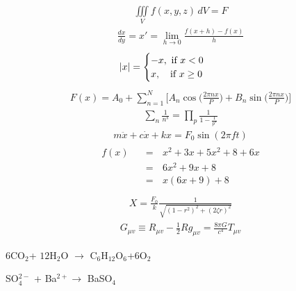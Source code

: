 \documentclass{article}
\newcommand\tab[1][1cm]{\hspace*{#1}}
\begin{document}
\begin{align*}
    \iiint\limits_{V} f(x,y,z) \,dV=F
\end{align*}
\begin{align*}
    \frac{dx}{dy}=x'=\lim_{h\to0} \frac{f(x+h)-f(x)}{h}
\end{align*}
\begin{align*}
    |x|=
    \begin{cases}
    -x,\text{ if } x<0 \tab\\
     x,\: \: \: \text{  if } x\ge0 \tab\\
    \end{cases}
\end{align*}
\begin{align*}
    F(x)=A_0+\sum_{n=1}^{N}\bigg[ A_n \cos\bigg({\frac{2\pi nx}{P}}\bigg)+B_n  \sin\bigg({\frac{2\pi nx}{P}}\bigg)\bigg]
\end{align*}
\begin{align*}
    \sum_{n}\frac{1}{n^s}=\prod_{p}\frac{1}{1-\frac{1}{p^s}}
\end{align*}
\begin{align*}
    m\ddot{x}+c\dot{x}+kx=F_0\sin(2\pi ft)
\end{align*}
\begin{align*}
    \begin{split}
         f(x)\:\:\: &= \:\:\:x^2+3x+5x^2+8+6x\\
        &= \:\:\: 6x^2+9x+8\\
        &=\:\:\: x(6x+9)+8\\
    \end{split}
\end{align*}
\begin{align*}
    X=\frac{F_0}{k}\frac{1}{\sqrt{(1-r^2)^2+ (2\zeta r)^2}}
\end{align*}
\begin{align*}
    G_{\mu v} \equiv R_{\mu v} -\frac{1}{2}R g_{\mu v}=\frac{8\pi G}{c^4}T_{\mu v}
\end{align*}
\begin{center}
$6$CO$_2$+ $12$H$_2$O $\rightarrow$ C$_6$H$_{12}$O$_6$+$6$O$_2$
\end{center}

\begin{center}
SO$_4^{2-}$ + Ba$^{2+} \rightarrow$ BaSO$_4$
\end{center}
\end{document}
